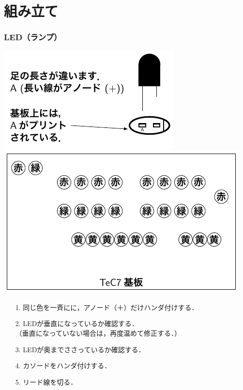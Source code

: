 \documentclass[handout]{beamer}        %
\begin{document}
\section{組み立て}
\begin{frame}
  \frametitle{LED（ランプ）}
  \vfill
  \centerline{\includegraphics[scale=0.65]{../Tikz/leds.pdf}\hspace{2cm}
    \includegraphics[scale=0.65]{../Tikz/leds2.pdf}}
  \vfill
  \begin{enumerate}
    \item[1.] 同じ色を一斉にに，アノード（＋）だけハンダ付けする．
    \item[2.] LEDが垂直になっているか確認する．\\
      （垂直になっていない場合は，再度温めて修正する．）
    \item[3.] LEDが奥までささっているか確認する．
    \item[4.] カソードをハンダ付けする．
    \item[5.] リード線を切る．
  \end{enumerate}
  \vfill
\end{frame}
\end{document}
